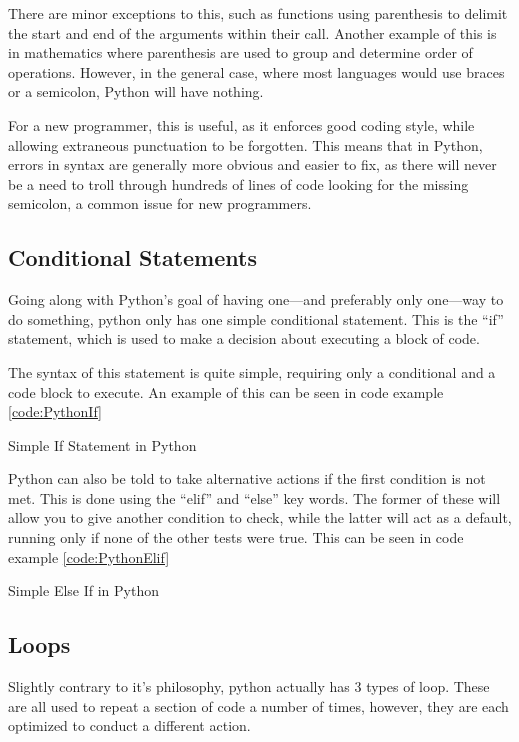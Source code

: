 			There are minor exceptions to this, such as functions using parenthesis to delimit the start and end of the arguments within their call. 
			Another example of this is in mathematics where parenthesis are used to group and determine order of operations. 
			However, in the general case, where most languages would use braces or a semicolon, Python will have nothing. 

			For a new programmer, this is useful, as it enforces good coding style, while allowing extraneous punctuation to be forgotten. 
			This means that in Python, errors in syntax are generally more obvious and easier to fix, as there will never be a need to troll through hundreds of lines of code looking for the missing semicolon, a common issue for new programmers. 
		\subsection{Conditional Statements}
			Going along with Python's goal of having one---and preferably only one---way to do something, python only has one simple conditional statement. 
			This is the ``if'' statement, which is used to make a decision about executing a block of code. 

			The syntax of this statement is quite simple, requiring only a conditional and a code block to execute. 
			An example of this can be seen in code example \ref{code:PythonIf}
			\begin{code}
				
				\caption{Simple If Statement in Python}
				\label{code:PythonIf}
			\end{code}

			Python can also be told to take alternative actions if the first condition is not met. 
			This is done using the ``elif'' and ``else'' key words. 
			The former of these will allow you to give another condition to check, while the latter will act as a default, running only if none of the other tests were true. 
			This can be seen in code example \ref{code:PythonElif}
			\begin{code}
				
				\caption{Simple Else If in Python}
				\label{code:PythonElif}
			\end{code}
		\subsection{Loops}
			Slightly contrary to it's philosophy, python actually has 3 types of loop. 
			These are all used to repeat a section of code a number of times, however, they are each optimized to conduct a different action. 

